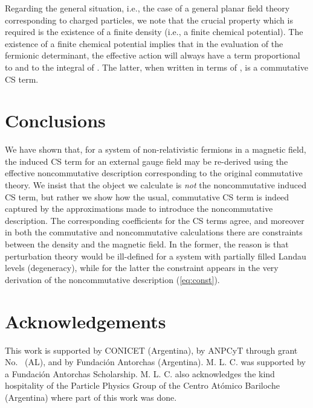 \documentclass[a4paper,12pt]{article}
\begin{document}
Regarding the general situation, i.e., the case of a general planar
field theory corresponding to charged particles, we note that the
crucial property which is required is the existence of a finite
density (i.e., a finite chemical potential).  The existence of a
finite chemical potential implies that in the evaluation of the
fermionic determinant, the effective action will always have a term
proportional to \myHighlight{$\mu$}\coordHE{} and to the integral of \coordHE{}. The
latter, when written in terms of \coordHE{}, is a commutative CS term.

\section {Conclusions}\label{sec:conc}
We have shown that, for a system of non-relativistic fermions in a
magnetic field, the induced CS term for an external gauge field may be
re-derived using the effective noncommutative description corresponding
to the original commutative theory. We insist that the object we
calculate is {\em not\/} the noncommutative induced CS term, but
rather we show how the usual, commutative CS term is indeed captured
by the approximations made to introduce the noncommutative
description.  The corresponding coefficients for the CS terms agree,
and moreover in both the commutative and noncommutative calculations
there are constraints between the density and the magnetic field. In
the former, the reason is that perturbation theory would be
ill-defined for a system with partially filled Landau  levels (degeneracy),
while for the latter the constraint appears in the very derivation of
the noncommutative description (\ref{eq:const}). 


\section{Acknowledgements}
This work is supported by CONICET (Argentina), by ANPCyT through grant
No.\ \coordHE{} (AL), and by Fundaci{\'o}n Antorchas (Argentina).
 M. L. C. 
was supported by a Fundaci{\'o}n Antorchas Scholarship. M. L. C.
also acknowledges the kind hospitality of the Particle Physics Group of the Centro
At{\'o}mico Bariloche (Argentina) where part of this work was done. 
\end{document}

